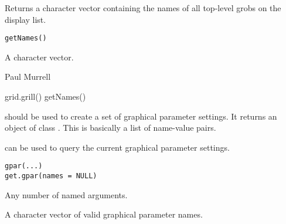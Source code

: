 %
\begin{Description}\relax
Returns a character vector containing the names of all
top-level grobs on the display list.
\end{Description}
%
\begin{Usage}
\begin{verbatim}
getNames()
\end{verbatim}
\end{Usage}
%
\begin{Value}
A character vector.
\end{Value}
%
\begin{Author}\relax
 Paul Murrell 
\end{Author}
%
\begin{Examples}
\begin{ExampleCode}
grid.grill()
getNames()
\end{ExampleCode}
\end{Examples}
%
\begin{Description}\relax
{} should be used to create a set of graphical
parameter settings.  It returns an object of class .  This is
basically a list of name-value pairs.

 can be used to query the current
graphical parameter settings.
\end{Description}
%
\begin{Usage}
\begin{verbatim}
gpar(...)
get.gpar(names = NULL)
\end{verbatim}
\end{Usage}
%
\begin{Arguments}
\begin{ldescription}
\item[\code{...}]  Any number of named arguments. 
\item[\code{names}] A character vector of valid graphical parameter names.
\end{ldescription}
\end{Arguments}
%
